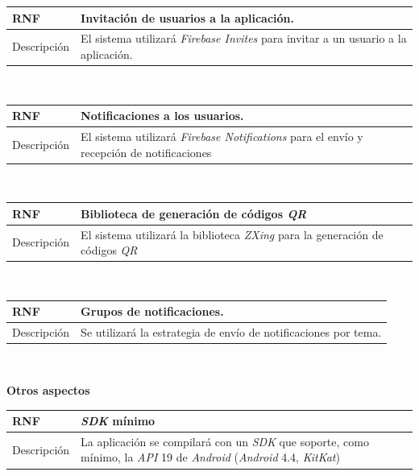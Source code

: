 \documentclass[twoside]{report}
\newcommand\addrow[2]{#1 &#2\\ }
\newcommand\addheading[2]{#1 &#2\\ \hline}
\newcommand\tabularhead{\begin{tabular}{lp{0.7\textwidth}}
\hline
}
\newenvironment{req}{\tabularhead}
{\hline\end{tabular}}
\begin{document}
\vspace{0.25cm}

\begin{req}
	\addheading{\textbf{RNF\arabic{nonFunctionalRequirements}}}{Invitación de usuarios a la aplicación.}
	\addrow{Descripción}{El sistema utilizará \textit{Firebase Invites} para invitar a un usuario a la aplicación.}
\end{req}\\

\vspace{0.25cm}

\begin{req}
	\addheading{\textbf{RNF\arabic{nonFunctionalRequirements}}}{Notificaciones a los usuarios.}
	\addrow{Descripción}{El sistema utilizará \textit{Firebase Notifications} para el envío y recepción de notificaciones}
\end{req}\\

\vspace{0.25cm}

\begin{req}
	\addheading{\textbf{RNF\arabic{nonFunctionalRequirements}}}{Biblioteca de generación de códigos \textit{QR}}
	\addrow{Descripción}{El sistema utilizará la biblioteca \textit{ZXing} para la generación de códigos \textit{QR}}
\end{req}\\

\vspace{0.25cm}

\begin{req}
	\addheading{\textbf{RNF\arabic{nonFunctionalRequirements}}}{Grupos de notificaciones.}
	\addrow{Descripción}{Se utilizará la estrategia de envío de notificaciones por tema.}
\end{req}\\

\vspace{1cm}

\textbf{Otros aspectos}\\

\begin{req}
	\addheading{\textbf{RNF\arabic{nonFunctionalRequirements}}}{\textit{SDK} mínimo}
	\addrow{Descripción}{La aplicación se compilará con un \textit{SDK} que soporte, como mínimo, la \textit{API} 19 de \textit{Android} (\textit{Android} 4.4, \textit{KitKat})\cite{androidversiondist}}
\end{req}\\
\end{document}
